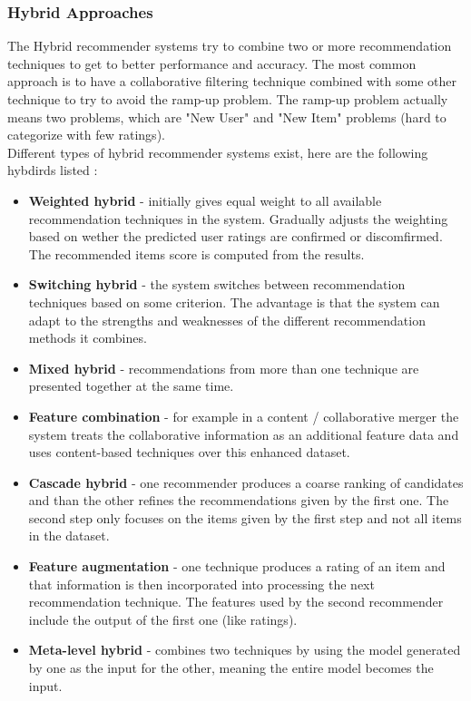 \documentclass[\myFontSize,a4paper,oneside,hidelinks]{article}
\begin{document}
\subsubsection{Hybrid Approaches}
The Hybrid recommender systems try to combine two or more recommendation techniques to get to better performance and accuracy. The most common approach is to have a collaborative filtering technique combined with some other technique to try to avoid the ramp-up problem.
The ramp-up problem actually means two problems, which are "New User" and "New Item" problems (hard to categorize with few ratings).\\
Different types of hybrid recommender systems exist, here are the following hybdirds listed \cite{Burke2002331}:
\begin{itemize}[label=--]
\item \textbf{Weighted hybrid} - initially gives equal weight to all available recommendation techniques in the system. Gradually adjusts the weighting based on wether the predicted user ratings are confirmed or discomfirmed. The recommended items score is computed from the results.
\item \textbf{Switching hybrid} - the system switches between recommendation techniques based on some criterion. The advantage is that the system can adapt to the strengths and weaknesses of the different recommendation methods it combines.
\item \textbf{Mixed hybrid} - recommendations from more than one technique are presented together at the same time. 
\item \textbf{Feature combination} - for example in a content / collaborative merger the system treats the collaborative information as an additional feature data and uses content-based techniques over this enhanced dataset.
\item \textbf{Cascade hybrid} - one recommender produces a coarse ranking of candidates and than the other refines the recommendations given by the first one. The second step only focuses on the items given by the first step and not all items in the dataset.
\item \textbf{Feature augmentation} - one technique produces a rating of an item and that information is then incorporated into processing the next recommendation technique. The features used by the second recommender include the output of the first one (like ratings).
\item \textbf{Meta-level hybrid} - combines two techniques by using the model generated by one as the input for the other, meaning the entire model becomes the input.\\
\end{itemize}
%
%
%
%
\end{document}
